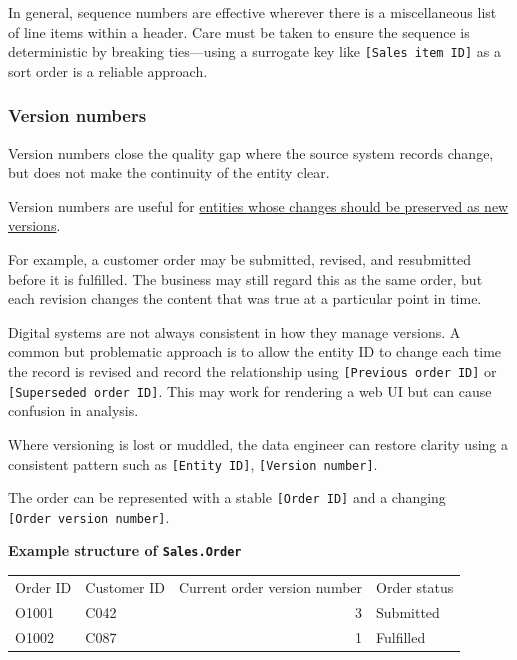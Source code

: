 \documentclass[10pt,openany,10pt]{book}
\newcounter{none}
\let\podeToprule\toprule
\let\podeMidrule\midrule
\let\podeBottomrule\bottomrule
\renewcommand{\toprule}{\arrayrulecolor{pbiGrid}\podeToprule}
\renewcommand{\midrule}{\arrayrulecolor{pbiGrid}\podeMidrule}
\renewcommand{\bottomrule}{\arrayrulecolor{pbiGrid}\podeBottomrule}
\begin{document}
In general, sequence numbers are effective wherever there is a
miscellaneous list of line items within a header. Care must be taken to
ensure the sequence is deterministic by breaking ties---using a
surrogate key like \texttt{{[}Sales\ item\ ID{]}} as a sort order is a
reliable approach.

\subsubsection{Version numbers}\label{version-numbers}

Version numbers close the quality gap where the source system records
change, but does not make the continuity of the entity clear.

Version numbers are useful for
\hyperref[docs-creating-information-entity-processing]{entities whose
changes should be preserved as new versions}.

For example, a customer order may be submitted, revised, and resubmitted
before it is fulfilled. The business may still regard this as the same
order, but each revision changes the content that was true at a
particular point in time.

Digital systems are not always consistent in how they manage versions. A
common but problematic approach is to allow the entity ID to change each
time the record is revised and record the relationship using
\texttt{{[}Previous\ order\ ID{]}} or
\texttt{{[}Superseded\ order\ ID{]}}. This may work for rendering a web
UI but can cause confusion in analysis.

Where versioning is lost or muddled, the data engineer can restore
clarity using a consistent pattern such as \texttt{{[}Entity\ ID{]}},
\texttt{{[}Version\ number{]}}.

The order can be represented with a stable \texttt{{[}Order\ ID{]}} and
a changing \texttt{{[}Order\ version\ number{]}}.

\textbf{Example structure of \texttt{Sales.Order}}

{\def\LTcaptype{none} %
\begin{longtable}[]{@{}llrl@{}}
\toprule\noalign{}
Order ID & Customer ID & Current order version number & Order status \\
\midrule\noalign{}
\endhead
\bottomrule\noalign{}
\endlastfoot
O1001 & C042 & 3 & Submitted \\
O1002 & C087 & 1 & Fulfilled \\
\end{longtable}
}
\end{document}
